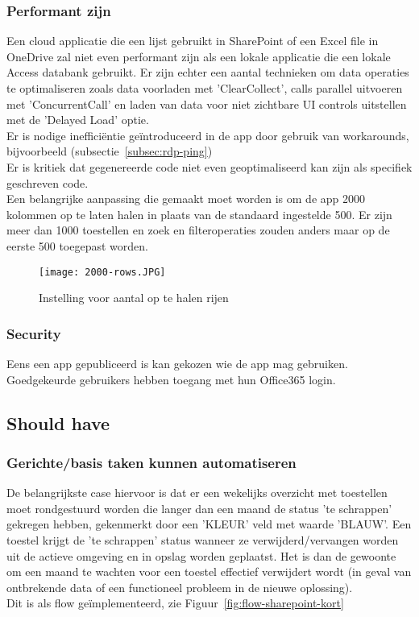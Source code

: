\subsubsection{Performant zijn}

Een cloud applicatie die een lijst gebruikt in SharePoint of een Excel file in OneDrive zal niet even performant zijn als een lokale applicatie die een lokale Access databank gebruikt. Er zijn echter een aantal technieken om data operaties te optimaliseren zoals data voorladen met 'ClearCollect', calls parallel uitvoeren met 'ConcurrentCall' en laden van data voor niet zichtbare UI controls uitstellen met de 'Delayed Load' optie. \autocite{Andaloussi2018}\\
Er is nodige inefficiëntie geïntroduceerd in de app door gebruik van workarounds, bijvoorbeeld (subsectie~\ref{subsec:rdp-ping})\\
Er is kritiek dat gegenereerde code niet even geoptimaliseerd kan zijn als specifiek geschreven code. \autocite{Shiah2018}\\
Een belangrijke aanpassing die gemaakt moet worden is om de app 2000 kolommen op te laten halen in plaats van de standaard ingestelde 500. Er zijn meer dan 1000 toestellen en zoek en filteroperaties zouden anders maar op de eerste 500 toegepast worden.

\begin{figure}[h!]
    \texttt{[image: 2000-rows.JPG]}
    \caption{Instelling voor aantal op te halen rijen}
    \label{fig:2000-rows}
\end{figure}

\subsubsection{Security}

Eens een app gepubliceerd is kan gekozen wie de app mag gebruiken. Goedgekeurde gebruikers hebben toegang met hun Office365 login.

\subsection{Should have}

\subsubsection{Gerichte/basis taken kunnen automatiseren}

De belangrijkste case hiervoor is dat er een wekelijks overzicht met toestellen moet rondgestuurd worden die langer dan een maand de status 'te schrappen' gekregen hebben, gekenmerkt door een 'KLEUR' veld met waarde 'BLAUW'. Een toestel krijgt de 'te schrappen' status wanneer ze verwijderd/vervangen worden uit de actieve omgeving en in opslag worden geplaatst. Het is dan de gewoonte om een maand te wachten voor een toestel effectief verwijdert wordt (in geval van ontbrekende data of een functioneel probleem in de nieuwe oplossing).\\
Dit is als flow geïmplementeerd, zie Figuur~\ref{fig:flow-sharepoint-kort}

